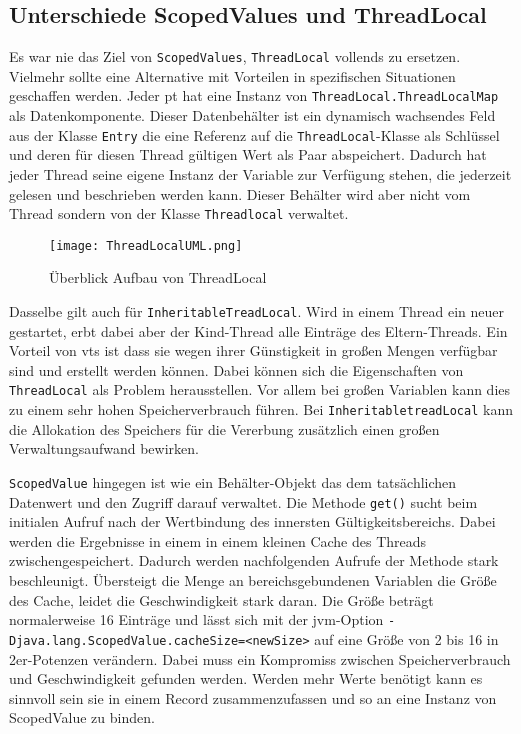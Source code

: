 \subsection{Unterschiede ScopedValues und ThreadLocal}
\label{subsec:UnterschiedeScopedValuesundThreadLocal}

    Es war nie das Ziel von \texttt{ScopedValues}, \texttt{ThreadLocal} vollends zu ersetzen. Vielmehr sollte eine Alternative mit Vorteilen in spezifischen Situationen geschaffen werden.
    Jeder \gls{pt} hat eine Instanz von \texttt{ThreadLocal.ThreadLocalMap} als Datenkomponente. Dieser Datenbehälter ist ein dynamisch wachsendes Feld aus
    der Klasse \texttt{Entry} die eine Referenz auf die \texttt{ThreadLocal}-Klasse als Schlüssel
    und deren für diesen Thread gültigen Wert als Paar abspeichert. Dadurch hat jeder Thread seine eigene Instanz der Variable zur Verfügung stehen, die jederzeit gelesen und beschrieben werden kann.
    Dieser Behälter wird aber nicht vom Thread sondern von der Klasse \texttt{Threadlocal} verwaltet. 
    \begin{figure}[H]
        \centering
        \texttt{[image: ThreadLocalUML.png]}
        \caption{Überblick Aufbau von ThreadLocal}
        \label{fig:ThreadLocalMap}
    \end{figure}
    Dasselbe gilt auch für \texttt{InheritableTreadLocal}. Wird in einem Thread ein neuer gestartet, erbt dabei aber der Kind-Thread alle Einträge des Eltern-Threads. 
    Ein Vorteil von \Glspl{vt} ist dass sie wegen ihrer Günstigkeit in großen Mengen verfügbar sind und erstellt werden können. Dabei können sich die Eigenschaften von \texttt{ThreadLocal}
    als Problem herausstellen. Vor allem bei großen Variablen kann dies zu einem sehr hohen Speicherverbrauch führen. Bei \texttt{InheritabletreadLocal} kann die Allokation des Speichers
    für die Vererbung zusätzlich einen großen Verwaltungsaufwand bewirken. 

    \texttt{ScopedValue} hingegen ist wie ein Behälter-Objekt das dem tatsächlichen Datenwert und den Zugriff darauf verwaltet. Die Methode \texttt{get()} sucht beim initialen Aufruf nach
    der Wertbindung des innersten Gültigkeitsbereichs. Dabei werden die Ergebnisse in einem in einem kleinen Cache des Threads zwischengespeichert. Dadurch werden nachfolgenden Aufrufe der
    Methode stark beschleunigt. Übersteigt die Menge an bereichsgebundenen Variablen die Größe des Cache, leidet die Geschwindigkeit stark daran. Die Größe beträgt normalerweise 16 Einträge
    und lässt sich mit der \gls{jvm}-Option \texttt{-Djava.lang.ScopedValue.cacheSize=<newSize>} auf eine Größe von 2 bis 16 in 2er-Potenzen verändern. Dabei muss ein Kompromiss
    zwischen Speicherverbrauch und Geschwindigkeit gefunden werden. Werden mehr Werte benötigt kann es sinnvoll sein sie in einem Record zusammenzufassen und so an eine Instanz von ScopedValue
    zu binden. 

